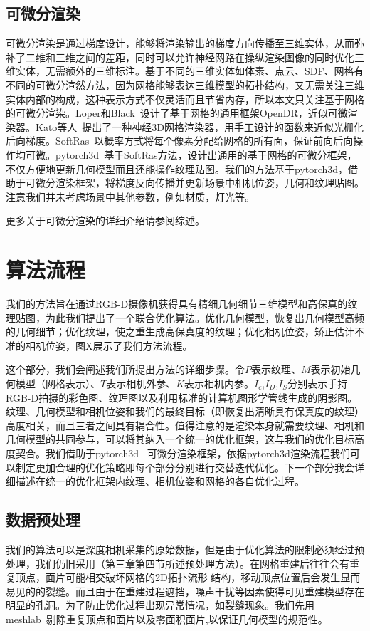 \subsection{可微分渲染}
可微分渲染是通过梯度设计，能够将渲染输出的梯度方向传播至三维实体，从而弥补了二维和三维之间的差距，同时可以允许神经网路在操纵渲染图像的同时优化三维实体，无需额外的三维标注。基于不同的三维实体如体素、点云、SDF、网格有不同的可微分渲然方法，因为网格能够表达三维模型的拓扑结构，又无需关注三维实体内部的构成，这种表示方式不仅灵活而且节省内存，所以本文只关注基于网格的可微分渲染。Loper和Black~\cite{MatthewLoper2014OpenDRAA}设计了基于网格的通用框架OpenDR，近似可微渲染器。Kato等人~\cite{MatthiasNiener2013Realtime3R}提出了一种神经3D网格渲染器，用手工设计的函数来近似光栅化后向梯度。SoftRas~\cite{ShichenLiu2019SoftRA}以概率方式将每个像素分配给网格的所有面，保证前向后向操作均可微。pytorch3d~\cite{ravi2020pytorch3d}基于SoftRas方法，设计出通用的基于网格的可微分框架，不仅方便地更新几何模型而且还能操作纹理贴图。我们的方法基于pytorch3d，借助于可微分渲染框架，将梯度反向传播并更新场景中相机位姿，几何和纹理贴图。注意我们并未考虑场景中其他参数，例如材质，灯光等。\par
更多关于可微分渲染的详细介绍请参阅综述\cite{HiroharuKato2020DifferentiableRA}。

%
%
\section{算法流程}

我们的方法旨在通过RGB-D摄像机获得具有精细几何细节三维模型和高保真的纹理贴图，为此我们提出了一个联合优化算法。优化几何模型，恢复出几何模型高频的几何细节；优化纹理，使之重生成高保真度的纹理；优化相机位姿，矫正估计不准的相机位姿，图X展示了我们方法流程。\par
这个部分，我们会阐述我们所提出方法的详细步骤。令$P$表示纹理、$M$表示初始几何模型（网格表示）、$T$表示相机外参、$K$表示相机内参。$I_c$,$I_D$,$I_S$分别表示手持RGB-D拍摄的彩色图、纹理图以及利用标准的计算机图形学管线生成的阴影图。纹理、几何模型和相机位姿和我们的最终目标（即恢复出清晰具有保真度的纹理）高度相关，而且三者之间具有耦合性。值得注意的是渲染本身就需要纹理、相机和几何模型的共同参与，可以将其纳入一个统一的优化框架，这与我们的优化目标高度契合。我们借助于pytorch3d ~\cite{ravi2020pytorch3d}可微分渲染框架，依据pytorch3d渲染流程我们可以制定更加合理的优化策略即每个部分分别进行交替迭代优化。下一个部分我会详细描述在统一的优化框架内纹理、相机位姿和网格的各自优化过程。\par
\subsection{数据预处理}
我们的算法可以是深度相机采集的原始数据，但是由于优化算法的限制必须经过预处理，我们仍旧采用（第三章第四节所述预处理方法）。在网格重建后往往会有重复顶点，面片可能相交破坏网格的2D拓扑流形
结构，移动顶点位置后会发生显而易见的的裂缝。而且由于在重建过程遮挡，噪声干扰等因素使得可见重建模型存在明显的孔洞。为了防止优化过程出现异常情况，如裂缝现象。我们先用meshlab~\cite{LocalChapterEvents:ItalChap:ItalianChapConf2008:129-136}剔除重复顶点和面片以及零面积面片,以保证几何模型的规范性。

